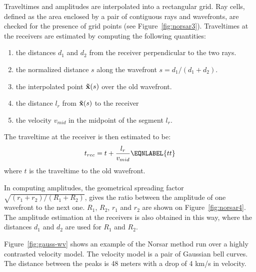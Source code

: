 Traveltimes and amplitudes are interpolated into a rectangular
grid. Ray cells, defined as the area enclosed by a pair of contiguous rays
and wavefronts, are checked for the presence of grid points
(see Figure~\ref{fig:norsar3}). Traveltimes at
the receivers are estimated by computing the following quantities:

\begin{enumerate}
 \item the distances $d_{1}$ and $d_{2}$ from the receiver perpendicular
 to the two rays.
 \item the normalized distance $s$ along the wavefront
 \( s = d_{1}/(d_{1}+d_{2}) \).
 \item the interpolated point ${\bf \vec{x}}(s)$ over the old wavefront.
 \item the distance $l_{r}$ from ${\bf \vec{x}}(s)$ to the receiver
 \item the velocity $v_{mid}$ in the midpoint of the segment $l_{r}$.
\end{enumerate}

The traveltime at the receiver is then estimated to be:
%
\begin{equation}
 t_{rec} = t + \frac{l_{r}}{v_{mid}}
\EQNLABEL{tt}
\end{equation}
%
where $t$ is the traveltime to the old wavefront.


In computing amplitudes,
the geometrical spreading factor \( \sqrt{(r_{1}+r_{2})/(R_{1}+R_{2})} \),
gives the ratio between the amplitude of one wavefront to the next
one. $R_{1}$, $R_{2}$, $r_{1}$ and $r_{2}$ are shown on
Figure~\ref{fig:norsar4}. The amplitude estimation at
the receivers is also obtained in this way, where the distances
$d_{1}$ and $d_{2}$ are used for $R_{1}$ and $R_{2}$.

Figure~\ref{fig:gauss-wv} shows an example of the Norsar method
run over a highly contrasted velocity model. The velocity model 
is a pair of Gaussian bell curves. The distance between
the peaks is 48 meters with a drop of 4 km/s in velocity.


